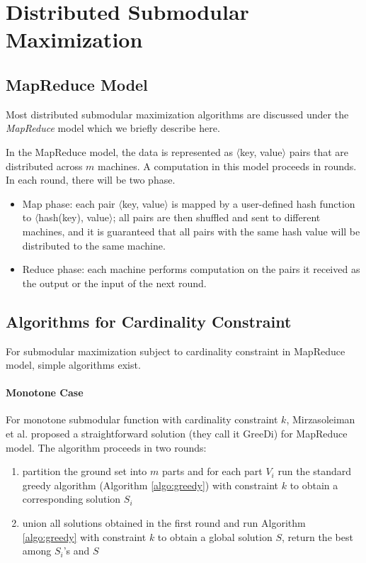 \section{Distributed Submodular Maximization}

\subsection{MapReduce Model}
Most distributed submodular maximization algorithms are discussed under the \emph{MapReduce} model \cite{DG08} which we briefly describe here.

In the MapReduce model, the data is represented as $\langle$key, value$\rangle$ pairs that are distributed across $m$ machines. A computation in this model proceeds in rounds. In each round, there will be two phase.
\begin{itemize}
\item Map phase: each pair $\langle$key, value$\rangle$ is mapped by a user-defined hash function to $\langle$hash(key), value$\rangle$; all pairs are then shuffled and sent to different machines, and it is guaranteed that all pairs with the same hash value  will be distributed to the same machine.
\item Reduce phase: each machine performs computation on the pairs it received as the output or the input of the next round.
\end{itemize}

\subsection{Algorithms for Cardinality Constraint}
For submodular maximization subject to cardinality constraint in MapReduce model, simple algorithms exist.

\paragraph{Monotone Case}
For monotone submodular function with cardinality constraint $k$, Mirzasoleiman et al. \cite{MKS+13} proposed a straightforward solution (they call it {\sc GreeDi}) for MapReduce model. The algorithm proceeds in two rounds:
\begin{enumerate}
\item partition the ground set into $m$ parts and for each part $V_i$ run the standard greedy algorithm (Algorithm \ref{algo:greedy}) with constraint $k$ to obtain a corresponding solution $S_i$
\item union all solutions obtained in the first round and run Algorithm \ref{algo:greedy} with constraint $k$ to obtain a global solution $S$, return the best among $S_i$'s and $S$
\end{enumerate}

